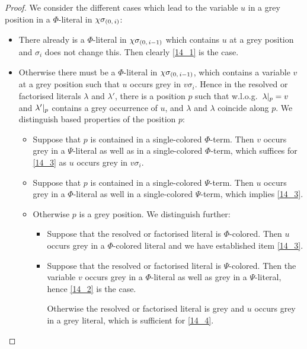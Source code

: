 \documentclass[,%
	draft=false,%
	numbers=noendperiod
	12pt,
	a4paper,
	oneside,%
	openany,
]{memoir}
\begin{document}
\begin{proof}
	We consider the different cases which lead to the variable $u$ in a grey position in a $\Phi$-literal in $\chi\sigma_{(0,\,i)}$:
	\begin{itemize}
		\item
			There already is a $\Phi$-literal in $\chi\sigma_{(0,\,i-1)}$ which contains $u$ at a grey position and $\sigma_i$ does not change this. Then clearly \ref{14_1} is the case.

		\item
			Otherwise there must be a $\Phi$-literal in $\chi\sigma_{(0,\,i-1)}$, which contains a variable $v$ at a grey position such that $u$ occurs grey in $v\sigma_i$.
			Hence in the resolved or factorised literals $\lambda$ and $\lambda'$, there is a position $p$ such that w.l.o.g.\ $\lambda|_{p} = v$ and $\lambda'|_{p}$ contains a grey occurrence of $u$, and $\lambda$ and $\lambda$ coincide along $p$.
			We distinguish based properties of the position $p$:

			\begin{itemize}
				\item
					Suppose that $p$ is contained in a single-colored $\Phi$-term.
					Then $v$ occurs grey in a $\Psi$-literal as well as in a single-colored $\Phi$-term, which suffices for \ref{14_3} as $u$ occurs grey in $v\sigma_i$.

				\item 
					Suppose that $p$ is contained in a single-colored $\Psi$-term.
					Then $u$ occurs grey in a $\Phi$-literal as well in a single-colored $\Psi$-term, which implies \ref{14_3}.

				\item
					Otherwise $p$ is a grey position.
					We distinguish further:

					\begin{itemize}
						\item Suppose that the resolved or factorised literal is $\Phi$-colored.
							Then $u$ occurs grey in a $\Phi$-colored literal and we have established item \ref{14_3}.

						\item Suppose that the resolved or factorised literal is $\Psi$-colored.
							Then the variable $v$ occurs grey in a $\Phi$-literal as well as grey in a $\Psi$-literal, hence \ref{14_2} is the case.

							Otherwise the resolved or factorised literal is grey and $u$ occurs grey in a grey literal, which is sufficient for \ref{14_4}.
							\qedhere
					\end{itemize}

			\end{itemize}

	\end{itemize}

\end{proof}
\end{document}
